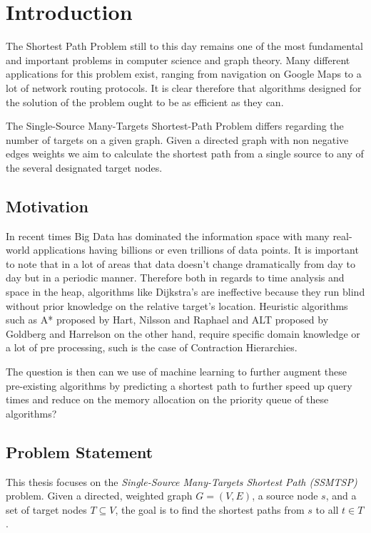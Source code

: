 \chapter{Introduction}
\label{ch:introduction}

The Shortest Path Problem still to this day remains one of the most fundamental and important problems in computer science and graph theory.
Many different applications for this problem exist, ranging from navigation on Google Maps to a lot of network routing protocols.
It is clear therefore that algorithms designed for the solution of the problem ought to be as efficient as they can. 

The Single-Source Many-Targets Shortest-Path Problem differs regarding the number of targets on a given graph. 
Given a directed graph with non negative edges weights we aim to calculate the shortest path from a single source to any of the several designated target nodes.

\section{Motivation}
In recent times Big Data has dominated the information space with many real-world applications having billions or even trillions of data points. 
It is important to note that in a lot of areas that data doesn't change dramatically from day to day but in a periodic manner. 
Therefore both in regards to time analysis and space in the heap, algorithms like Dijkstra's\cite{dijkstraNoteTwoProblems1959} are ineffective because they run blind without prior knowledge on the relative target's location. 
Heuristic algorithms such as A*\cite{hartFormalBasisHeuristic1968b} proposed by Hart, Nilsson and Raphael and ALT\cite{goldbergComputingShortestPath2005} proposed by Goldberg and Harrelson on the other hand, 
require specific domain knowledge or a lot of pre processing, such is the case of Contraction Hierarchies\cite{geisbergerContractionHierarchiesFaster2008}.

The question is then can we use of machine learning to further augment these pre-existing algorithms by predicting a shortest path to further speed up query times and reduce on the memory allocation on the priority queue of these algorithms?



\section{Problem Statement}
This thesis focuses on the \textit{Single-Source Many-Targets Shortest Path (SSMTSP)} problem. 
Given a directed, weighted graph $G=(V, E)$, a source node $s$, and a set of target nodes $T \subseteq V$, the goal is to find the shortest paths from $s$ to all $t \in T$.

